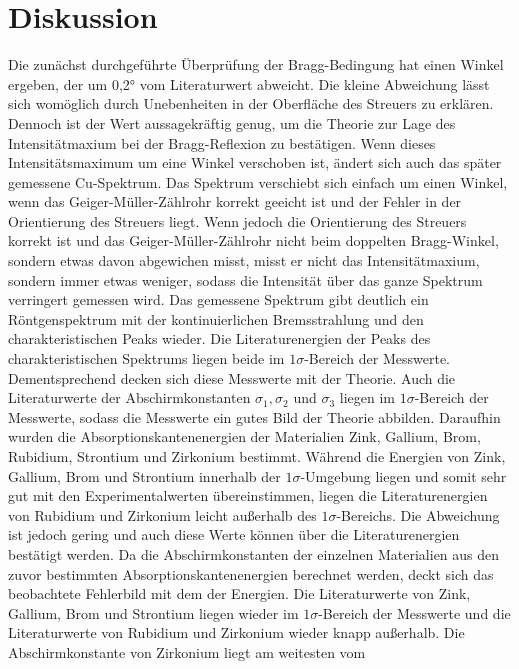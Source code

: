\documentclass[titlepage = firstcover]{scrartcl}
\begin{document}
        
        \newpage
        \section{Diskussion}
            Die zunächst durchgeführte Überprüfung der Bragg-Bedingung hat einen Winkel ergeben, der um 0,2° vom Literaturwert abweicht. Die kleine Abweichung lässt sich womöglich durch Unebenheiten
            in der Oberfläche des Streuers zu erklären. Dennoch ist der Wert aussagekräftig genug, um die Theorie zur Lage des Intensitätmaxium bei der Bragg-Reflexion zu bestätigen. Wenn dieses
            Intensitätsmaximum um eine Winkel verschoben ist, ändert sich auch das später gemessene Cu-Spektrum. Das Spektrum verschiebt sich einfach um einen Winkel, wenn das Geiger-Müller-Zählrohr
            korrekt geeicht ist und der Fehler in der Orientierung des Streuers liegt. Wenn jedoch die Orientierung des Streuers korrekt ist und das Geiger-Müller-Zählrohr nicht beim doppelten
            Bragg-Winkel, sondern etwas davon abgewichen misst, misst er nicht das Intensitätmaxium, sondern immer etwas weniger, sodass die Intensität über das ganze Spektrum verringert gemessen wird.
            Das gemessene Spektrum gibt deutlich ein Röntgenspektrum mit der kontinuierlichen Bremsstrahlung und den charakteristischen Peaks wieder.
            Die Literaturenergien der Peaks des charakteristischen Spektrums liegen beide im $1\sigma$-Bereich der Messwerte. Dementsprechend decken sich diese Messwerte mit der Theorie. Auch die Literaturwerte der 
            Abschirmkonstanten $\sigma_1, \sigma_2$ und $\sigma_3$ liegen im $1\sigma$-Bereich der Messwerte, sodass die Messwerte ein gutes Bild der Theorie abbilden.
            Daraufhin wurden die Absorptionskantenenergien der Materialien Zink, Gallium, Brom, Rubidium, Strontium und Zirkonium bestimmt. Während die Energien von Zink, Gallium, Brom und Strontium
            innerhalb der $1\sigma$-Umgebung liegen und somit sehr gut mit den Experimentalwerten übereinstimmen, liegen die Literaturenergien von Rubidium und Zirkonium leicht außerhalb des 
            $1\sigma$-Bereichs. Die Abweichung ist jedoch gering und auch diese Werte können über die Literaturenergien bestätigt werden. Da die Abschirmkonstanten der einzelnen Materialien aus 
            den zuvor bestimmten Absorptionskantenenergien berechnet werden, deckt sich das beobachtete Fehlerbild mit dem der Energien. Die Literaturwerte von Zink, Gallium, Brom und Strontium
            liegen wieder im $1\sigma$-Bereich der Messwerte und die Literaturwerte von Rubidium und Zirkonium wieder knapp außerhalb. Die Abschirmkonstante von Zirkonium liegt am weitesten vom 
\end{document}
